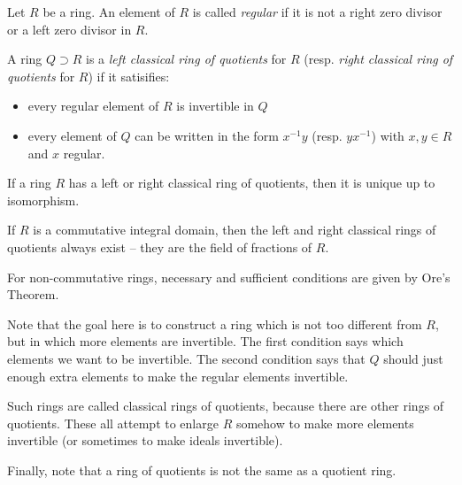 \documentclass[12pt]{article}
\begin{document}
Let $R$ be a ring.  An element of $R$ is called \emph{regular} if it is not a right zero divisor or a left zero divisor in $R$.

A ring $Q \supset R$ is a \emph{left classical ring of quotients} for $R$
(resp. \emph{right classical ring of quotients} for $R$) if it satisifies:
\begin{itemize}
\item every regular element of $R$ is invertible in $Q$
\item every element of $Q$ can be written in the form $x^{-1}y$ (resp. $yx^{-1}$) with $x, y \in R$
and $x$ regular.
\end{itemize}

If a ring $R$ has a left or right classical ring of quotients, then it is unique up to isomorphism.

If $R$ is a commutative integral domain, then the left and right classical rings of quotients always exist -- they are the field of fractions of $R$.

For non-commutative rings, necessary and sufficient conditions are given by Ore's Theorem.

Note that the goal here is to construct a ring which is not too different from $R$, but in which more elements are invertible.  The first condition says which elements we want to be invertible.  The second condition says that $Q$ should  just enough extra elements to make the regular elements invertible.

Such rings are called classical rings of quotients, because there are other rings of quotients.  These all attempt to enlarge $R$ somehow to make more elements invertible (or sometimes to make ideals invertible).

Finally, note that a ring of quotients is not the same as a quotient ring.
\end{document}
